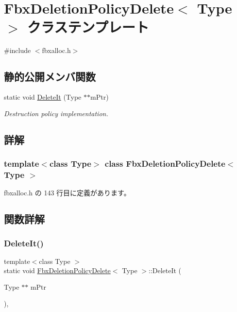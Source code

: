 \hypertarget{class_fbx_deletion_policy_delete}{}\section{Fbx\+Deletion\+Policy\+Delete$<$ Type $>$ クラステンプレート}
\label{class_fbx_deletion_policy_delete}


{\ttfamily \#include $<$fbxalloc.\+h$>$}

\subsection*{静的公開メンバ関数}
\begin{DoxyCompactItemize}
\item 
static void \hyperlink{class_fbx_deletion_policy_delete_ae09420cded9deb38e063f37a1f7d7d11}{Delete\+It} (Type $\ast$$\ast$m\+Ptr)
\begin{DoxyCompactList}\small\item\em Destruction policy implementation. \end{DoxyCompactList}\end{DoxyCompactItemize}


\subsection{詳解}
\subsubsection*{template$<$class Type$>$\newline
class Fbx\+Deletion\+Policy\+Delete$<$ Type $>$}



 fbxalloc.\+h の 143 行目に定義があります。



\subsection{関数詳解}
\mbox{\label{class_fbx_deletion_policy_delete_ae09420cded9deb38e063f37a1f7d7d11}} 
\subsubsection{\texorpdfstring{Delete\+It()}{DeleteIt()}}
{\footnotesize\ttfamily template$<$class Type $>$ \\
static void \hyperlink{class_fbx_deletion_policy_delete}{Fbx\+Deletion\+Policy\+Delete}$<$ Type $>$\+::Delete\+It (\begin{DoxyParamCaption}\item[{Type $\ast$$\ast$}]{m\+Ptr }\end{DoxyParamCaption})\hspace{0.3cm}{\ttfamily [inline]}, {\ttfamily [static]}}



